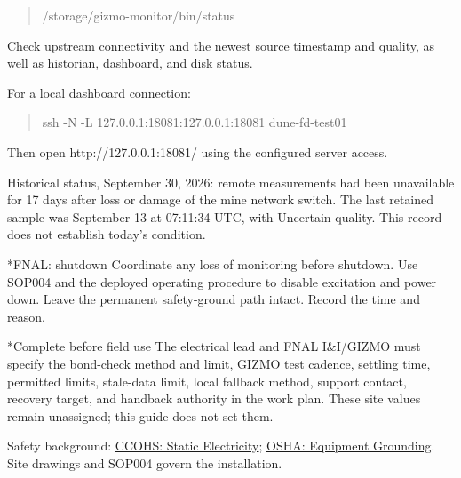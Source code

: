 \documentclass[10pt]{article}
\makeatletter
\renewcommand\section{\@startsection{section}{1}{\z@}{1.2ex plus .2ex}{.6ex}{\normalfont\large\bfseries}}
\makeatother
\begin{document}
\begin{quote}\ttfamily\small
/storage/gizmo-monitor/bin/status
\end{quote}
Check upstream connectivity and the newest source timestamp and quality, as well as historian, dashboard, and disk status.

For a local dashboard connection:

\begin{quote}\ttfamily\small
ssh -N -L 127.0.0.1:18081:127.0.0.1:18081 dune-fd-test01
\end{quote}
Then open http://127.0.0.1:18081/ using the configured server access.

Historical status, September 30, 2026: remote measurements had been unavailable for 17 days after loss or damage of the mine network switch. The last retained sample was September 13 at 07:11:34 UTC, with Uncertain quality. This record does not establish today's condition.

\section*{FNAL: shutdown}
Coordinate any loss of monitoring before shutdown. Use SOP004 and the deployed operating procedure to disable excitation and power down. Leave the permanent safety-ground path intact. Record the time and reason.

\section*{Complete before field use}
The electrical lead and FNAL I\&I/GIZMO must specify the bond-check method and limit, GIZMO test cadence, settling time, permitted limits, stale-data limit, local fallback method, support contact, recovery target, and handback authority in the work plan. These site values remain unassigned; this guide does not set them.

Safety background: \href{https://www.ccohs.ca/oshanswers/chemicals/static-electricity.html}{CCOHS: Static Electricity}; \href{https://www.osha.gov/etools/construction/electrical-incidents/grounding}{OSHA: Equipment Grounding}. Site drawings and SOP004 govern the installation.
\end{document}
